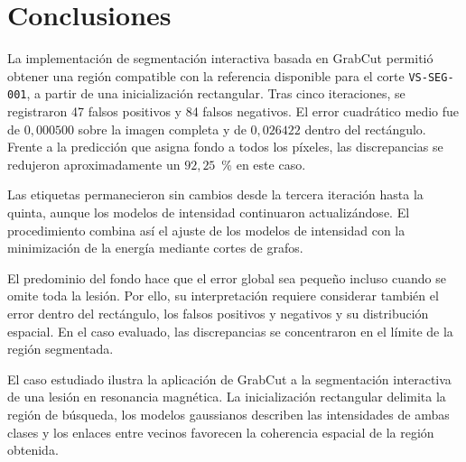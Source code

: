 \section{Conclusiones}
\label{sec:conclusiones}

La implementación de segmentación interactiva basada en GrabCut permitió
obtener una región compatible con la referencia disponible para el corte
\texttt{VS-SEG-001}, a partir de una inicialización rectangular. Tras cinco
iteraciones, se registraron 47 falsos positivos y 84 falsos negativos. El
error cuadrático medio fue de $0{,}000500$ sobre la imagen completa y de
$0{,}026422$ dentro del rectángulo. Frente a la predicción que asigna fondo
a todos los píxeles, las discrepancias se redujeron aproximadamente un
$92{,}25$~\% en este caso.

Las etiquetas permanecieron sin cambios desde la tercera iteración hasta
la quinta, aunque los modelos de intensidad continuaron actualizándose.
El procedimiento combina así el ajuste de los modelos de intensidad con
la minimización de la energía mediante cortes de grafos.

El predominio del fondo hace que el error global sea pequeño incluso
cuando se omite toda la lesión. Por ello, su interpretación requiere
considerar también el error dentro del rectángulo, los falsos positivos y
negativos y su distribución espacial. En el caso evaluado, las
discrepancias se concentraron en el límite de la región segmentada.

El caso estudiado ilustra la aplicación de GrabCut a la segmentación
interactiva de una lesión en resonancia magnética. La inicialización
rectangular delimita la región de búsqueda, los modelos gaussianos
describen las intensidades de ambas clases y los enlaces entre vecinos
favorecen la coherencia espacial de la región obtenida.
